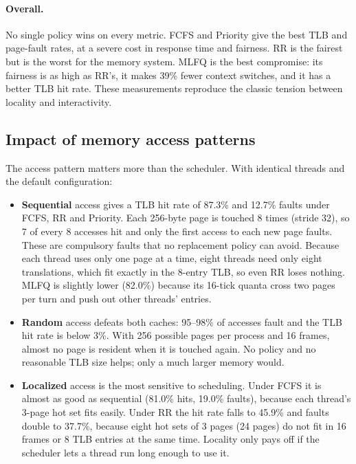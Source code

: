 \documentclass[11pt]{article}
\begin{document}
\paragraph{Overall.} No single policy wins on every metric. FCFS and Priority give the best TLB and
page-fault rates, at a severe cost in response time and fairness. RR is the fairest but is the
worst for the memory system. MLFQ is the best compromise: its fairness is as high as RR's, it makes
39\% fewer context switches, and it has a better TLB hit rate. These measurements reproduce the
classic tension between locality and interactivity.

\subsection{Impact of memory access patterns}
The access pattern matters more than the scheduler. With identical threads and the default
configuration:
\begin{itemize}
\item \textbf{Sequential} access gives a TLB hit rate of 87.3\% and 12.7\% faults under FCFS, RR and
      Priority. Each 256-byte page is touched 8 times (stride 32), so 7 of every 8 accesses hit and
      only the first access to each new page faults. These are compulsory faults that no
      replacement policy can avoid. Because each thread uses only one page at a time, eight threads
      need only eight translations, which fit exactly in the 8-entry TLB, so even RR loses nothing.
      MLFQ is slightly lower (82.0\%) because its 16-tick quanta cross two pages per turn and push
      out other threads' entries.
\item \textbf{Random} access defeats both caches: 95--98\% of accesses fault and the TLB hit rate is
      below 3\%. With 256 possible pages per process and 16 frames, almost no page is resident when
      it is touched again. No policy and no reasonable TLB size helps; only a much larger memory
      would.
\item \textbf{Localized} access is the most sensitive to scheduling. Under FCFS it is almost as good
      as sequential (81.0\% hits, 19.0\% faults), because each thread's 3-page hot set fits easily.
      Under RR the hit rate falls to 45.9\% and faults double to 37.7\%, because eight hot sets of
      3 pages (24 pages) do not fit in 16 frames or 8 TLB entries at the same time. Locality only
      pays off if the scheduler lets a thread run long enough to use it.
\end{itemize}
\end{document}
